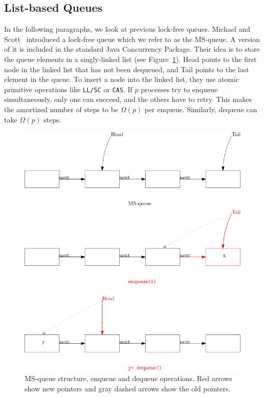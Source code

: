 \documentclass[12pt]{article}
\begin{document}
\subsection{List-based Queues}
In the following paragraphs, we look at previous lock-free queues.
Michael and Scott~\cite{DBLP:conf/podc/MichaelS96} introduced a lock-free queue which we refer to as the MS-queue. A version of it is included in the standard Java Concurrency Package. Their idea is to store the queue elements in a singly-linked list (see Figure~\ref{fig::msq}). Head points to the first node in the linked list that has not been dequeued, and Tail points to the last element in the queue. To insert a node into the linked list, they use atomic primitive operations like \texttt{LL/SC} or \texttt{CAS}. If $p$ processes try to enqueue simultaneously, only one can succeed, and the others have to retry. This makes the amortized number of steps to be $\Omega(p)$ per enqueue. Similarly, dequeue can take $\Omega(p)$ steps.

\begin{figure}[t]
  \center\includegraphics[scale=0.5]{pics/msqueue}
  \caption{\label{fig::msq}MS-queue structure, enqueue and dequeue operations. Red arrows show new pointers and gray dashed arrows show the old pointers.}
\end{figure}
\end{document}
